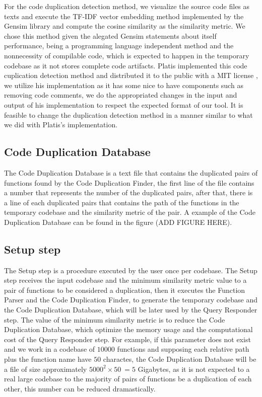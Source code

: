 For the code duplication detection method, we visualize the source code files as texts and execute the TF-IDF vector embedding method
implemented by the Gensim library \citep{gensim} and compute the cosine similarity as the similarity metric. We chose this method 
given the alegated Gensim statements about itself performance, being a programming language independent method and the nonnecessity of 
compilable code, which is expected to happen in the temporary codebase as it not stores complete code artifacts. Platis implemented
this code cuplication detection method and distributed it to the public with a MIT license \citep{platistool} \citep{mitlicense}, 
we utilize his implementation as it has some nice to have components such as removing code comments, we do the appropriated changes
in the input and output of his implementation to respect the expected format of our tool. 
It is feasible to change the duplication detection method in a manner similar to what we did with Platis's implementation.

\subsection{Code Duplication Database}

The Code Duplication Database is a text file that contains the duplicated pairs of functions found by the Code Duplication Finder, 
the first line of the file contains a number that represents the number of the duplicated pairs, after that, there is 
a line of each duplicated pairs that contains the path of the functions in the temporary codebase and the similarity metric of the 
pair. A example of the Code Duplication Database can be found in the figure (ADD FIGURE HERE). 

\subsection{Setup step}

The Setup step is a procedure executed by the user once per codebase. The Setup step receives the input codebase and the minimum
similarity metric value to a pair of functions to be considered a duplication, then it executes the Function Parser and the Code 
Duplication Finder, to generate the temporary codebase and the Code Duplication Database, which will be later used by the Query
Responder step. The value of the minimum similarity metric is to reduce the Code Duplication Database, which optimize the
memory usage and the computational cost of the Query Responder step. For example, if this parameter does not exist and we work in 
a codebase of $10000$ functions and supposing each relative path plus the function name have $50$ charactes, the Code Duplication 
Database will be a file of size approximately $5000^2 \times 50 ~= 5$ Gigabytes, as it is not expected to a real large codebase 
to the majority of pairs of functions be a duplication of each other, this number can be reduced dramastically.

